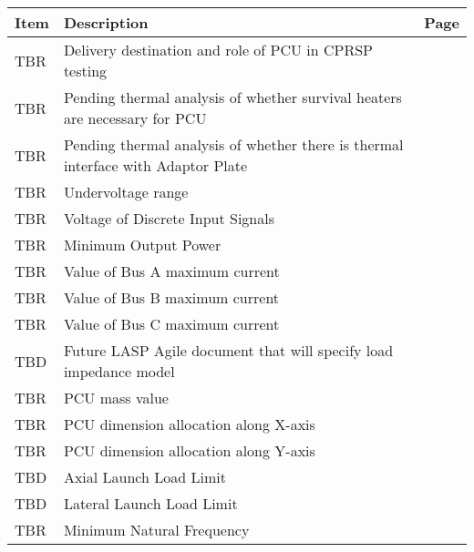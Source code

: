 
            \clearpage
            \sffamily
            \bfseries
            \normalfont
            \centering
            \begin{table}[htbp]
            \begin{minipage}{\linewidth}
            \setlength{\tymax}{0.5\linewidth}
            \centering
            \small\begin{tabular}{| >{\centering\arraybackslash}m{1.25in}| >{\centering\arraybackslash}m{2.95in}| >{\centering\arraybackslash}m{1.5in}|} \hline
            \bfseries{Item} & \bfseries{Description} & \bfseries{Page}\\
            \hline
            TBR & Delivery destination and role of PCU in CPRSP testing & \pageref{tbx_1}  \\ 
 \hline 
TBR & Pending thermal analysis of whether survival heaters are necessary for PCU & \pageref{tbx_2}  \\ 
 \hline 
TBR & Pending thermal analysis of whether there is thermal interface with Adaptor Plate & \pageref{tbx_3}  \\ 
 \hline 
TBR & Undervoltage range & \pageref{tbx_4}  \\ 
 \hline 
TBR & Voltage of Discrete Input Signals & \pageref{tbx_5}  \\ 
 \hline 
TBR & Minimum Output Power & \pageref{tbx_6}  \\ 
 \hline 
TBR & Value of Bus A maximum current & \pageref{tbx_7}  \\ 
 \hline 
TBR & Value of Bus B maximum current & \pageref{tbx_8}  \\ 
 \hline 
TBR & Value of Bus C maximum current & \pageref{tbx_9}  \\ 
 \hline 
TBD & Future LASP Agile document that will specify load impedance model & \pageref{tbx_10}  \\ 
 \hline 
TBR & PCU mass value & \pageref{tbx_11}  \\ 
 \hline 
TBR & PCU dimension allocation along X-axis & \pageref{tbx_12}  \\ 
 \hline 
TBR & PCU dimension allocation along Y-axis & \pageref{tbx_13}  \\ 
 \hline 
TBD & Axial Launch Load Limit & \pageref{tbx_14}  \\ 
 \hline 
TBD & Lateral Launch Load Limit & \pageref{tbx_15}  \\ 
 \hline 
TBR & Minimum Natural Frequency & \pageref{tbx_16}  \\ 

\end{tabular}
\end{minipage}
\end{table}
